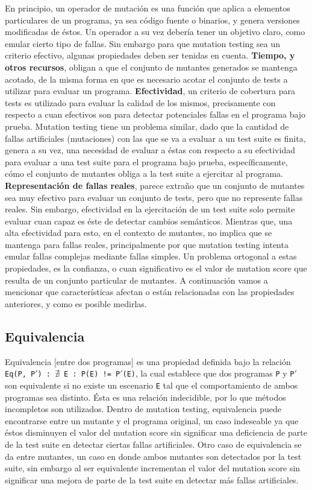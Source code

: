 En principio, un operador de mutaci\'on es una funci\'on que aplica a elementos particulares de un programa, ya sea c\'odigo fuente o binarios, y genera versiones modificadas de \'estos. Un operador a su vez deber\'ia tener un objetivo claro, como emular cierto tipo de fallas. Sin embargo para que mutation testing sea un criterio efectivo, algunas propiedades deben ser tenidas en cuenta. \textbf{Tiempo, y otros recursos}, obligan a que el conjunto de mutantes generados se mantenga acotado, de la misma forma en que es necesario acotar el conjunto de tests a utilizar para evaluar un programa. \textbf{Efectividad}, un criterio de cobertura para tests es utilizado para evaluar la calidad de los mismos, precisamente con respecto a cuan efectivos son para detectar potenciales fallas en el programa bajo prueba. Mutation testing tiene un problema similar, dado que la cantidad de fallas artificiales (mutaciones) con las que se va a evaluar a un test suite es finita, genera a su vez, una necesidad de evaluar a \'estas con respecto a su efectividad para evaluar a una test suite para el programa bajo prueba, espec\'ificamente, c\'omo el conjunto de mutantes obliga a la test suite a ejercitar al programa. \textbf{Representaci\'on de fallas reales}, parece extra\~no que un conjunto de mutantes sea muy efectivo para evaluar un conjunto de tests, pero que no represente fallas reales. Sin embargo, efectividad en la ejercitaci\'on de un test suite solo permite evaluar cuan capaz es \'este de detectar cambios sem\'anticos. Mientras que, una alta efectividad para esto, en el contexto de mutantes, no implica que se mantenga para fallas reales, principalmente por que mutation testing intenta emular fallas complejas mediante fallas simples. Un problema ortogonal a estas propiedades, es la confianza, o cuan significativo es el valor de mutation score que resulta de un conjunto particular de mutantes. A continuaci\'on vamos a mencionar que caracter\'isticas afectan o est\'an relacionadas con las propiedades anteriores, y como es posible medirlas.

\subsection{Equivalencia}

Equivalencia [entre dos programas] es una propiedad definida bajo la relaci\'on \texttt{Eq(P, P$\prime$) : $\nexists$ E : P(E) != P$\prime$(E)}, la cual establece que dos programas \texttt{P} y \texttt{P$\prime$} son equivalente si no existe un escenario \texttt{E} tal que el comportamiento de ambos programas sea distinto. \'Esta es una relaci\'on indecidible, por lo que m\'etodos incompletos son utilizados. Dentro de mutation testing, equivalencia puede encontrarse entre un mutante y el programa original, un caso indeseable ya que \'estos disminuyen el valor del mutation score sin significar una deficiencia de parte de la test suite en detectar ciertas fallas artificiales. Otro caso de equivalencia se da entre mutantes, un caso en donde ambos mutantes son detectados por la test suite, sin embargo al ser equivalente incrementan el valor del mutation score sin significar una mejora de parte de la test suite en detectar m\'as fallas artificiales.


